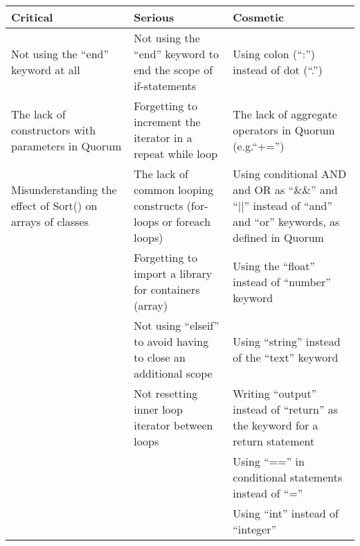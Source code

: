 \begin{table}[]
\centering
\renewcommand{\arraystretch}{1.5}
\label{QuorumProblemResult}
\begin{tabular}{| p{5cm} | p{5cm} | p{5cm} |}
\hline
\textbf{Critical}                                          & \textbf{Serious}                                                   & \textbf{Cosmetic}                                                                                        \\ \hline
Not using the “end” keyword at all                         & Not using the “end” keyword to end the scope of if-statements      & Using colon (“:”) instead of dot (“.”)                                                                   \\ \hline
The lack of constructors with parameters in Quorum         & Forgetting to increment the iterator in a repeat while loop        & The lack of aggregate operators in Quorum (e.g.“+=”)                                                        \\ \hline
Misunderstanding the effect of Sort() on arrays of classes & The lack of common looping constructs (for-loops or foreach loops) & Using conditional AND and OR as “\&\&” and “||” instead of “and” and “or” keywords, as defined in Quorum \\ \hline
                                                           & Forgetting to import a library for containers (array)              & Using the “float” instead of “number” keyword                                                            \\ \hline
                                                           & Not using “elseif” to avoid having to close an additional scope    & Using “string” instead of the “text” keyword                                                             \\ \hline
                                                           & Not resetting inner loop iterator between loops                    & Writing “output” instead of “return” as the keyword for a return statement                               \\ \hline
                                                           &                                                                    & Using “==” in conditional statements instead of “=”                                                      \\ \hline
                                                           &                                                                    & Using “int” instead of “integer”                                                                         \\ \hline

\end{tabular}
\end{table}
